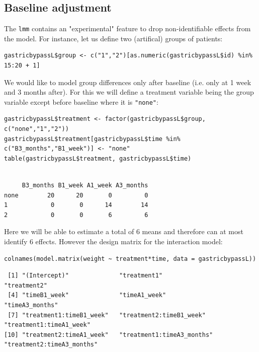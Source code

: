 \documentclass[12pt]{article}
\begin{document}
\clearpage

\subsection{Baseline adjustment}
\label{sec:orgaac249a}

The \texttt{lmm} contains an "experimental" feature to drop non-identifiable
effects from the model. For instance, let us define two (artifical) groups of
patients:
\lstset{language=r,label= ,caption= ,captionpos=b,numbers=none}
\begin{lstlisting}
gastricbypassL$group <- c("1","2")[as.numeric(gastricbypassL$id) %in% 15:20 + 1]
\end{lstlisting}
We would like to model group differences only after baseline
(i.e. only at 1 week and 3 months after). For this we will define a
treatment variable being the group variable except before baseline where
it is \texttt{"none"}:
\lstset{language=r,label= ,caption= ,captionpos=b,numbers=none}
\begin{lstlisting}
gastricbypassL$treatment <- factor(gastricbypassL$group, c("none","1","2"))
gastricbypassL$treatment[gastricbypassL$time %in% c("B3_months","B1_week")] <- "none"
table(gastricbypassL$treatment, gastricbypassL$time)
\end{lstlisting}

\begin{verbatim}

     B3_months B1_week A1_week A3_months
none        20      20       0         0
1            0       0      14        14
2            0       0       6         6
\end{verbatim}


Here we will be able to estimate a total of 6 means and therefore can
at most identify 6 effects. However the design matrix for the
interaction model:
\lstset{language=r,label= ,caption= ,captionpos=b,numbers=none}
\begin{lstlisting}
colnames(model.matrix(weight ~ treatment*time, data = gastricbypassL))
\end{lstlisting}

\begin{verbatim}
 [1] "(Intercept)"              "treatment1"               "treatment2"              
 [4] "timeB1_week"              "timeA1_week"              "timeA3_months"           
 [7] "treatment1:timeB1_week"   "treatment2:timeB1_week"   "treatment1:timeA1_week"  
[10] "treatment2:timeA1_week"   "treatment1:timeA3_months" "treatment2:timeA3_months"
\end{verbatim}
\end{document}
